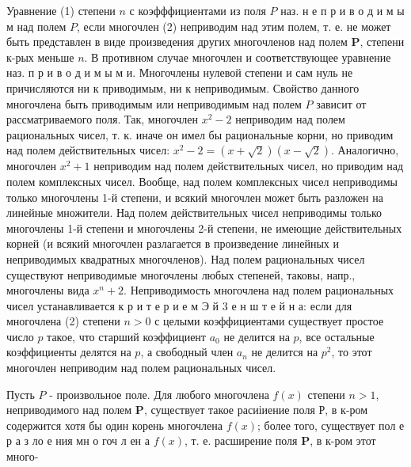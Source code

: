 \documentclass[10pt]{article}
\begin{document}
Уравнение (1) степени $n$ с коэфффициентами из поля $P$ наз. н е п р и в о д и м ы м над полем $P$, если многочлен (2) неприводим над этим полем, т. е. не может быть представлен в виде произведения других многочленов над полем $\boldsymbol{P}$, степени к-рых меньше $n$. В противном случае многочлен и соответствующее уравнение наз. п р и в о д и м ы м и. Многочлены нулевой степени и сам нуль не причисляются ни к приводимым, ни к неприводимым. Свойство данного многочлена быть приводимым или неприводимым над полем $P$ зависит от рассматриваемого поля. Так, многочлен $x^{2}-2$ неприводим над полем рациональных чисел, т. к. иначе он имел бы рациональные корни, но приводим над полем действительных чисел: $x^{2}-2=(x+\sqrt{2})(x-\sqrt{2})$. Аналогично, многочлен $x^{2}+1$ неприводим над полем действительных чисел, но приводим над полем комплексных чисел. Вообще, над полем комплексных чисел неприводимы только многочлены 1-й степени, и всякий многочлен может быть разложен на линейные множители. Над полем действительных чисел неприводимы только многочлены 1-й степени и многочлены 2-й степени, не имеющие действительных корней (и всякий многочлен разлагается в произведение линейных и неприводимых квадратных многочленов). Над полем рациональных чисел существуют неприводимые многочлены любых степеней, таковы, напр., многочлены вида $x^{n}+2$. Неприводимость многочлена над полем рациональных чисел устанавливается к р и т е р и е м Э й 3 е н ш т е й н а: если для многочлена (2) степени $n>0$ с целыми коэффициентами существует простое число $p$ такое, что старший коэффициент $a_{0}$ не делится на $p$, все остальные коэффициенты делятся на $p$, а свободный член $a_{n}$ не делится на $p^{2}$, то этот многочлен неприводим над полем рациональных чисел.



Пусть $P$ - произвольное поле. Для любого многочлена $f(x)$ степени $n>1$, неприводимого над полем $\boldsymbol{P}$, существует такое расиіиение поля Р, в к-ром содержится хотя бы один корень многочлена $f(x)$; более того, существует пол е р а з ло е ния мн о гоч л ен а $f(x)$, т. е. расширение поля $\boldsymbol{P}$, в к-ром этот много-
\end{document}
